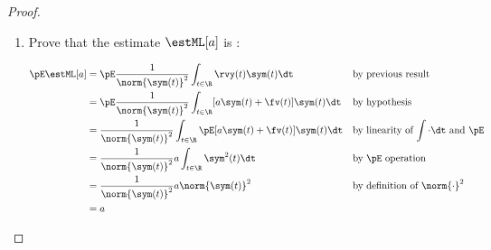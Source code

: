 \begin{proof}
\begin{enumerate}
\item Prove that the estimate $\estML[a]$ is :

\begin{align*}
   \pE\estML[a]
     &= \pE\frac{1}{\norm{\sym(t)}^2} \int_{t\in\R} \rvy(t)\sym(t) \dt
     && \text{by previous result}
   \\&= \pE\frac{1}{\norm{\sym(t)}^2} \int_{t\in\R} [ a \sym(t)+\fv(t)]\sym(t) \dt
     && \text{by hypothesis}
   \\&= \frac{1}{\norm{\sym(t)}^2} \int_{t\in\R} \pE[ a \sym(t)+\fv(t)]\sym(t) \dt
     && \text{by linearity of $\int\cdot\dt$ and $\pE$}
   \\&= \frac{1}{\norm{\sym(t)}^2}  a  \int_{t\in\R} \sym^2(t) \dt
     && \text{by $\pE$ operation}
   \\&= \frac{1}{\norm{\sym(t)}^2}  a  \norm{\sym(t)}^2
     && \text{by definition of $\norm{\cdot}^2$}
   \\&=   a
\end{align*}


\end{enumerate}
\end{proof}
